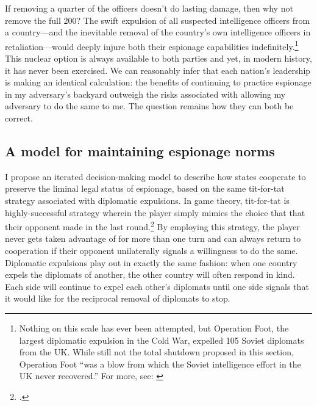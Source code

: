 \documentclass[12pt]{extarticle}
\begin{document}
If removing a quarter of the officers doesn't do lasting damage, then why not remove the full 200? The swift expulsion of all suspected intelligence officers from a country---and the inevitable removal of the country's own intelligence officers in retaliation---would deeply injure both their espionage capabilities indefinitely.\footnote{Nothing on this scale has ever been attempted, but Operation Foot, the largest diplomatic expulsion in the Cold War, expelled 105 Soviet diplomats from the UK. While still not the total shutdown proposed in this section, Operation Foot \enquote{was a blow from which the Soviet intelligence effort in the UK never recovered.} For more, see: \cite{hughes_giving_2006-1}} This nuclear option is always available to both parties and yet, in modern history, it has never been exercised. We can reasonably infer that each nation's leadership is making an identical calculation: the benefits of continuing to practice espionage in my adversary's backyard outweigh the risks associated with allowing my adversary to do the same to me. The question remains how they can both be correct.

\subsection{A model for maintaining espionage norms}
I propose an iterated decision-making model to describe how states cooperate to preserve the liminal legal status of espionage, based on the same tit-for-tat strategy associated with diplomatic expulsions. In game theory, tit-for-tat is highly-successful strategy wherein the player simply mimics the choice that that their opponent made in the last round.\footcite[8]{axelrod_effective_1980} By employing this strategy, the player never gets taken advantage of for more than one turn and can always return to cooperation if their opponent unilaterally signals a willingness to do the same. Diplomatic expulsions play out in exactly the same fashion: when one country expels the diplomats of another, the other country will often respond in kind. Each side will continue to expel each other's diplomats until one side signals that it would like for the reciprocal removal of diplomats to stop.

\end{document}
